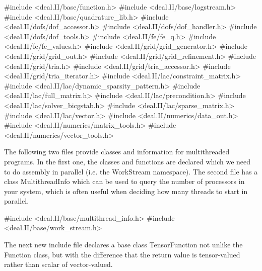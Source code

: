 \begin{DoxyCode}
\textcolor{preprocessor}{#include <deal.II/base/function.h>}
\textcolor{preprocessor}{#include <deal.II/base/logstream.h>}
\textcolor{preprocessor}{#include <deal.II/base/quadrature\_lib.h>}
\textcolor{preprocessor}{#include <deal.II/dofs/dof\_accessor.h>}
\textcolor{preprocessor}{#include <deal.II/dofs/dof\_handler.h>}
\textcolor{preprocessor}{#include <deal.II/dofs/dof\_tools.h>}
\textcolor{preprocessor}{#include <deal.II/fe/fe\_q.h>}
\textcolor{preprocessor}{#include <deal.II/fe/fe\_values.h>}
\textcolor{preprocessor}{#include <deal.II/grid/grid\_generator.h>}
\textcolor{preprocessor}{#include <deal.II/grid/grid\_out.h>}
\textcolor{preprocessor}{#include <deal.II/grid/grid\_refinement.h>}
\textcolor{preprocessor}{#include <deal.II/grid/tria.h>}
\textcolor{preprocessor}{#include <deal.II/grid/tria\_accessor.h>}
\textcolor{preprocessor}{#include <deal.II/grid/tria\_iterator.h>}
\textcolor{preprocessor}{#include <deal.II/lac/constraint\_matrix.h>}
\textcolor{preprocessor}{#include <deal.II/lac/dynamic\_sparsity\_pattern.h>}
\textcolor{preprocessor}{#include <deal.II/lac/full\_matrix.h>}
\textcolor{preprocessor}{#include <deal.II/lac/precondition.h>}
\textcolor{preprocessor}{#include <deal.II/lac/solver\_bicgstab.h>}
\textcolor{preprocessor}{#include <deal.II/lac/sparse\_matrix.h>}
\textcolor{preprocessor}{#include <deal.II/lac/vector.h>}
\textcolor{preprocessor}{#include <deal.II/numerics/data\_out.h>}
\textcolor{preprocessor}{#include <deal.II/numerics/matrix\_tools.h>}
\textcolor{preprocessor}{#include <deal.II/numerics/vector\_tools.h>}
\end{DoxyCode}


The following two files provide classes and information for multithreaded programs. In the first one, the classes and functions are declared which we need to do assembly in parallel (i.\+e. the {\ttfamily Work\+Stream} namespace). The second file has a class Multithread\+Info which can be used to query the number of processors in your system, which is often useful when deciding how many threads to start in parallel.


\begin{DoxyCode}
\textcolor{preprocessor}{#include <deal.II/base/multithread\_info.h>}
\textcolor{preprocessor}{#include <deal.II/base/work\_stream.h>}
\end{DoxyCode}


The next new include file declares a base class {\ttfamily Tensor\+Function} not unlike the {\ttfamily Function} class, but with the difference that the return value is tensor-\/valued rather than scalar of vector-\/valued.


